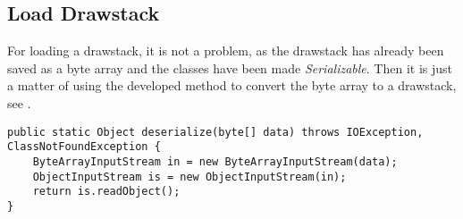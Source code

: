 \subsection*{Load Drawstack}
For loading a drawstack, it is not a problem, as the drawstack has already been saved as a byte array and the classes have been made \textit{Serializable}.
Then it is just a matter of using the developed method to convert the byte array to a drawstack, see .

\begin{lstlisting}[caption={Method for converting byte array to object}, label=lst:desrialize]
public static Object deserialize(byte[] data) throws IOException, ClassNotFoundException {
	ByteArrayInputStream in = new ByteArrayInputStream(data);
	ObjectInputStream is = new ObjectInputStream(in);
	return is.readObject();
}
\end{lstlisting}
          


